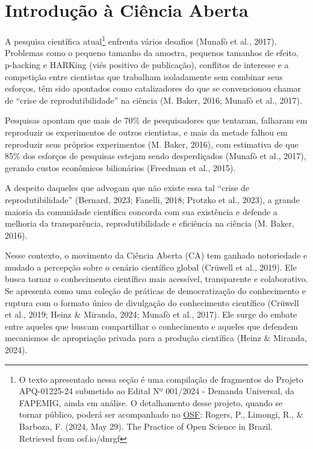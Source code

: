 \documentclass[
  a4paper,
]{article}
\begin{document}

\section{Introdução à Ciência Aberta}\label{sec-intro}

A pesquisa científica atual\footnote{O texto apresentado nessa seção é
  uma compilação de fragmentos do Projeto APQ-01225-24 submetido ao
  Edital Nº 001/2024 - Demanda Universal, da FAPEMIG, ainda em análise.
  O detalhamento desse projeto, quando se tornar público, poderá ser
  acompanhado no \href{http://osf.io/dnrgf}{OSF}: Rogers, P., Limongi,
  R., \& Barboza, F. (2024, May 29). The Practice of Open Science in
  Brazil. Retrieved from osf.io/dnrgf} enfrenta vários desafios (Munafò
et al., 2017). Problemas como o pequeno tamanho da amostra, pequenos
tamanhos de efeito, p-hacking e HARKing (viés positivo de publicação),
conflitos de interesse e a competição entre cientistas que trabalham
isoladamente sem combinar seus esforços, têm sido apontados como
catalizadores do que se convencionou chamar de ``crise de
reprodutibilidade'' na ciência (M. Baker, 2016; Munafò et al., 2017).

Pesquisas apontam que mais de 70\% de pesquisadores que tentaram,
falharam em reproduzir os experimentos de outros cientistas, e mais da
metade falhou em reproduzir seus próprios experimentos (M. Baker, 2016),
com estimativa de que 85\% dos esforços de pesquisas estejam sendo
desperdiçados (Munafò et al., 2017), gerando custos econômicos
bilionários (Freedman et al., 2015).

A despeito daqueles que advogam que não existe essa tal ``crise de
reprodutibilidade'' (Bernard, 2023; Fanelli, 2018; Protzko et al.,
2023), a grande maioria da comunidade científica concorda com sua
existência e defende a melhoria da transparência, reprodutibilidade e
eficiência na ciência (M. Baker, 2016).

Nesse contexto, o movimento da Ciência Aberta (CA) tem ganhado
notoriedade e mudado a percepção sobre o cenário científico global
(Crüwell et al., 2019). Ele busca tornar o conhecimento científico mais
acessível, transparente e colaborativo. Se apresenta como uma coleção de
práticas de democratização do conhecimento e ruptura com o formato único
de divulgação do conhecimento científico (Crüwell et al., 2019; Heinz \&
Miranda, 2024; Munafò et al., 2017). Ele surge do embate entre aqueles
que buscam compartilhar o conhecimento e aqueles que defendem mecanismos
de apropriação privada para a produção científica (Heinz \& Miranda,
2024).
\end{document}
